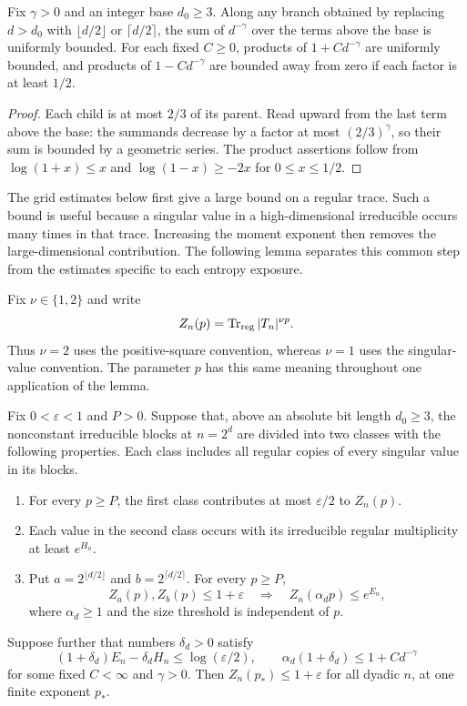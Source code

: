 \begin{lemma}\label{lem:dyadic-exponents}
Fix $\gamma>0$ and an integer base $d_0\ge3$. Along any branch
obtained by replacing $d>d_0$ with $\lfloor d/2\rfloor$ or
$\lceil d/2\rceil$, the sum of $d^{-\gamma}$ over the terms
above the base is uniformly bounded. For each fixed $C\ge0$, products of
$1+C d^{-\gamma}$ are uniformly bounded, and products of
$1-C d^{-\gamma}$ are bounded away from zero if each factor
is at least $1/2$.
\end{lemma}
\begin{proof}
Each child is at most $2/3$ of its parent. Read upward from the
last term above the base: the summands decrease by a factor at
most $(2/3)^\gamma$, so their sum is bounded by a geometric
series. The product assertions follow from
$\log(1+x)\le x$ and $\log(1-x)\ge-2x$ for $0\le x\le1/2$.
\end{proof}

The grid estimates below first give a large bound on a regular trace.
Such a bound is useful because a singular value in a high-dimensional
irreducible occurs many times in that trace. Increasing the moment
exponent then removes the large-dimensional contribution. The following
lemma separates this common step from the estimates specific to each
entropy exposure.

Fix $\nu\in\{1,2\}$ and write
\[
 Z_n(p)=\operatorname{Tr}_{\rm reg}|T_n|^{\nu p}.
\]
Thus $\nu=2$ uses the positive-square convention, whereas $\nu=1$
uses the singular-value convention. The parameter $p$ has this same
meaning throughout one application of the lemma.

\begin{lemma}
\label{lem:balanced-moment-closure}
Fix $0<\varepsilon<1$ and $P>0$. Suppose that, above an absolute
bit length $d_0\ge3$, the nonconstant irreducible blocks at $n=2^d$ are divided
into two classes with the following properties. Each class includes
all regular copies of every singular value in its blocks.
\begin{enumerate}
\item For every $p\ge P$, the first class contributes at most
$\varepsilon/2$ to $Z_n(p)$.
\item Each value in the second class occurs with its irreducible
regular multiplicity at least $e^{H_n}$.
\item Put $a=2^{\lfloor d/2\rfloor}$ and
$b=2^{\lceil d/2\rceil}$. For every $p\ge P$,
\[
 Z_a(p),Z_b(p)\le1+\varepsilon
 \quad\Longrightarrow\quad
 Z_n(\alpha_d p)\le e^{E_n},
\]
where $\alpha_d\ge1$ and the size threshold is independent of $p$.
\end{enumerate}
Suppose further that numbers $\delta_d>0$ satisfy
\[
 (1+\delta_d)E_n-\delta_d H_n\le\log(\varepsilon/2),
 \qquad
 \alpha_d(1+\delta_d)\le1+C d^{-\gamma}
\]
for some fixed $C<\infty$ and $\gamma>0$.
Then $Z_n(p_*)\le1+\varepsilon$ for all dyadic $n$, at one
finite exponent $p_*$.
\end{lemma}

